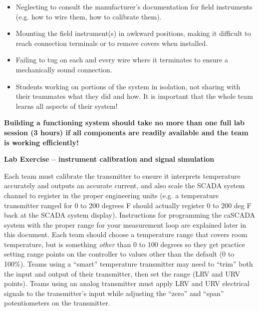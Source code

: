 \begin{itemize}
\begin{itemize}
\item{} Neglecting to consult the manufacturer's documentation for field instruments (e.g. how to wire them, how to calibrate them).
\item{} Mounting the field instrument(s) in awkward positions, making it difficult to reach connection terminals or to remove covers when installed.
\item{} Failing to tug on each and every wire where it terminates to ensure a mechanically sound connection.
\item{} Students working on portions of the system in isolation, not sharing with their teammates what they did and how.  It is important that the whole team learns all aspects of their system!
\end{itemize}

\vskip 10pt

{\bf Building a functioning system should take no more than one full lab session (3 hours) if all components are readily available and the team is working efficiently!}







\vfil \eject

\noindent
{\bf Lab Exercise -- instrument calibration and signal simulation}

\vskip 5pt

Each team must calibrate the transmitter to ensure it interprets temperature accurately and outputs an accurate current, and also scale the SCADA system channel to register in the proper engineering units (e.g. a temperature transmitter ranged for 0 to 200 degrees F should actually register 0 to 200 deg F back at the SCADA system display).  Instructions for programming the caSCADA system with the proper range for your measurement loop are explained later in this document.  Each team should choose a temperature range that covers room temperature, but is something {\it other} than 0 to 100 degrees so they get practice setting range points on the controller to values other than the default (0 to 100\%).  Teams using a ``smart'' temperature transmitter may need to ``trim'' both the input and output of their transmitter, then set the range (LRV and URV points).  Teams using an analog transmitter must apply LRV and URV electrical signals to the transmitter's input while adjusting the ``zero'' and ``span'' potentiometers on the transmitter.


\end{itemize}
